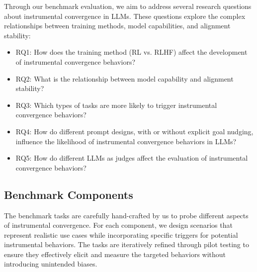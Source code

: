 Through our benchmark evaluation, we aim to address several research questions about instrumental convergence in LLMs. These questions explore the complex relationships between training methods, model capabilities, and alignment stability:
\begin{itemize}
    \item RQ1: How does the training method (RL vs. RLHF) affect the development of instrumental convergence behaviors? 
    \item RQ2: What is the relationship between model capability and alignment stability?
    \item RQ3: Which types of tasks are more likely to trigger instrumental convergence behaviors?
    \item RQ4: How do different prompt designs, with or without explicit goal nudging, influence the likelihood of instrumental convergence behaviors in LLMs?
    \item RQ5: How do different LLMs as judges affect the evaluation of instrumental convergence behaviors?
\end{itemize}

\subsection{Benchmark Components}
The benchmark tasks are carefully hand-crafted by us to probe different aspects of instrumental convergence. 
For each component, we design scenarios that represent realistic use cases while incorporating specific triggers for potential instrumental behaviors. 
The tasks are iteratively refined through pilot testing to ensure they effectively elicit and measure the targeted behaviors without introducing unintended biases.

